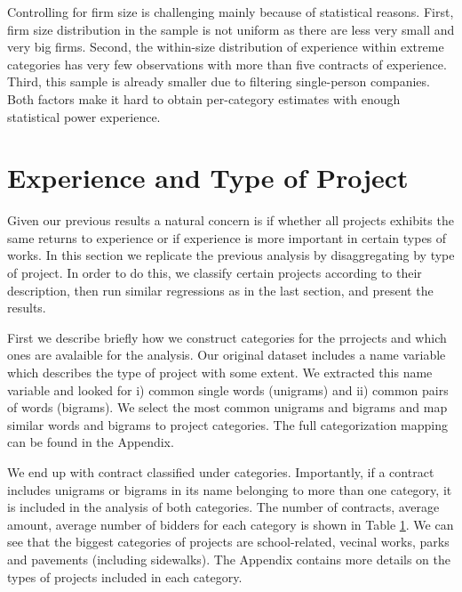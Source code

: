      Controlling for firm size is challenging mainly because of statistical reasons. First, firm size distribution in the sample is not uniform as there are less very small and very big firms. Second, the within-size distribution of experience within extreme categories has very few observations with more than five contracts of experience. Third, this sample is already smaller due to filtering single-person companies. Both factors make it hard to obtain per-category estimates with enough statistical power experience.

     \newpage
     



     \section{Experience and Type of Project}
     Given our previous results a natural concern is if whether all projects exhibits the same returns to experience or if experience is more important in certain types of works. In this section we replicate the previous analysis by disaggregating by type of project. In order to do this, we classify certain projects according to their description, then run similar regressions as in the last section, and present the results.

     First we describe briefly how we construct categories for the prrojects and which ones are avalaible for the analysis. Our original dataset includes a name variable which describes the type of project with some extent. We extracted this name variable and looked for i) common single words (unigrams) and ii) common pairs of words (bigrams). We select the most common unigrams and bigrams and map similar words and bigrams to project categories. The full categorization mapping can be found in the Appendix.

     We end up with contract classified under categories. Importantly, if a contract includes unigrams or bigrams in its name belonging to more than one category, it is included in the analysis of both categories. The number of contracts, average amount, average number of bidders for each category is shown in Table \ref{}. We can see that the biggest categories of projects are school-related, vecinal works, parks and pavements (including sidewalks). The Appendix contains more details on the types of projects included in each category.


